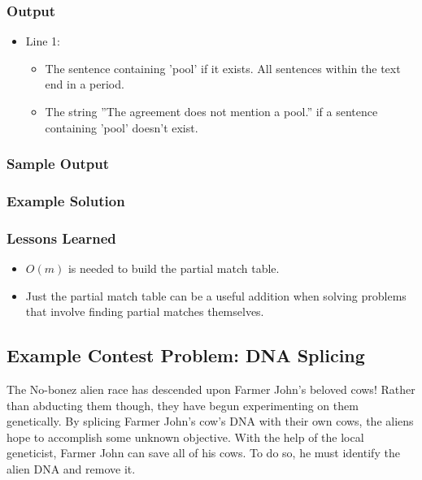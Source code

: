 \subsubsection{Output}
\begin{itemize}
	\item Line 1:
	\begin{itemize}
		\item The sentence containing 'pool' if it exists. All sentences within the text end in a period.
		\item The string ''The agreement does not mention a pool.'' if a sentence containing 'pool' doesn't exist.
	\end{itemize}
\end{itemize}

\subsubsection{Sample Output}

\subsubsection{Example Solution}

\subsubsection{Lessons Learned}
\begin{itemize}
	\item $O(m)$ is needed to build the partial match table.
	\item Just the partial match table can be a useful addition when solving problems that involve finding partial matches themselves.
\end{itemize}

\subsection{Example Contest Problem: DNA Splicing}
The No-bonez alien race has descended upon Farmer John's beloved cows!
Rather than abducting them though, they have begun experimenting on them genetically.
By splicing Farmer John's cow's DNA with their own cows, the aliens hope to accomplish some unknown objective.
With the help of the local geneticist, Farmer John can save all of his cows.
To do so, he must identify the alien DNA and remove it.

